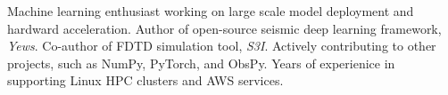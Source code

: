 

\begin{cvparagraph}

	Machine learning enthusiast working on large scale model deployment and hardward acceleration.
	Author of open-source seismic deep learning framework, \textit{Yews}. Co-author of FDTD simulation tool, \textit{S3I}. Actively contributing to other projects, such as NumPy, PyTorch, and ObsPy.
	Years of experienice in supporting Linux HPC clusters and AWS services.
\end{cvparagraph}
